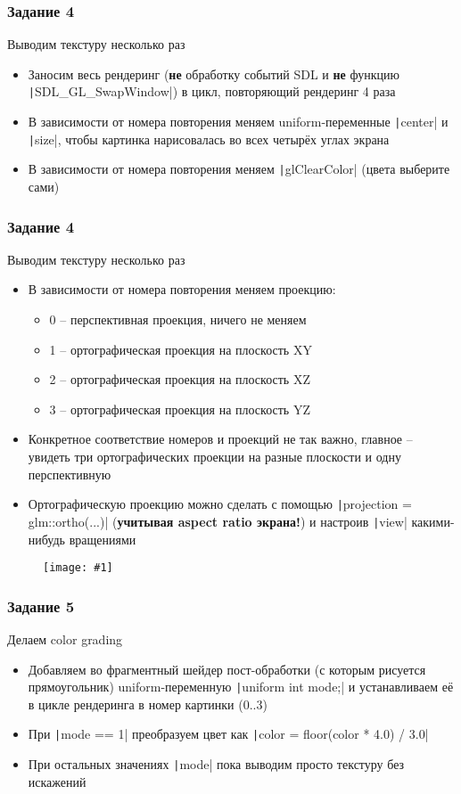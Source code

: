 \documentclass{beamer}
\newcommand{\slideimage}[1]{
  \begin{figure}
    \begin{adjustbox}{width=\textwidth, totalheight=\textheight-2\baselineskip-2\baselineskip,keepaspectratio}
      \texttt{[image: \#1]}
    \end{adjustbox}
  \end{figure}
}
\begin{document}
\begin{frame}[fragile]
\frametitle{Задание 4}
Выводим текстуру несколько раз
\begin{itemize}
\item Заносим весь рендеринг (\textbf{не} обработку событий SDL и \textbf{не} функцию \texttt|SDL_GL_SwapWindow|) в цикл, повторяющий рендеринг 4 раза
\item В зависимости от номера повторения меняем uniform-переменные \texttt|center| и \texttt|size|, чтобы картинка нарисовалась во всех четырёх углах экрана
\item В зависимости от номера повторения меняем \texttt|glClearColor| (цвета выберите сами)
\end{itemize}
\end{frame}

\begin{frame}[fragile]
\frametitle{Задание 4}
Выводим текстуру несколько раз
\begin{itemize}
\item В зависимости от номера повторения меняем проекцию:
\begin{itemize}
\item 0 -- перспективная проекция, ничего не меняем
\item 1 -- ортографическая проекция на плоскость XY
\item 2 -- ортографическая проекция на плоскость XZ
\item 3 -- ортографическая проекция на плоскость YZ
\end{itemize}
\item Конкретное соответствие номеров и проекций не так важно, главное -- увидеть три ортографических проекции на разные плоскости и одну перспективную
\item Ортографическую проекцию можно сделать с помощью \texttt|projection = glm::ortho(...)| (\textbf{учитывая aspect ratio экрана!}) и настроив \texttt|view| какими-нибудь вращениями
\end{itemize}
\end{frame}

\begin{frame}[fragile]
\slideimage{4.png}
\end{frame}

\begin{frame}[fragile]
\frametitle{Задание 5}
Делаем color grading
\begin{itemize}
\item Добавляем во фрагментный шейдер пост-обработки (с которым рисуется прямоугольник) uniform-переменную \texttt|uniform int mode;| и устанавливаем её в цикле рендеринга в номер картинки (0..3)
\item При \texttt|mode == 1| преобразуем цвет как \texttt|color = floor(color * 4.0) / 3.0|
\item При остальных значениях \texttt|mode| пока выводим просто текстуру без искажений
\end{itemize}
\end{frame}
\end{document}
